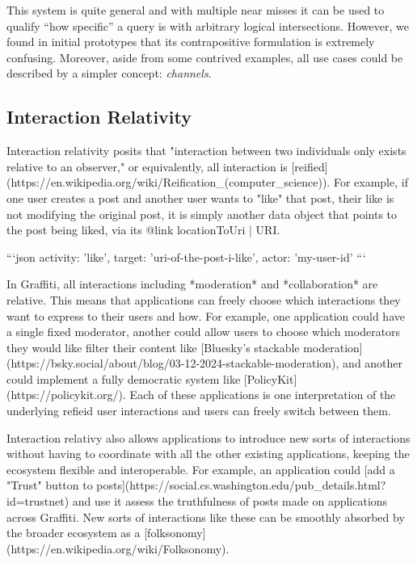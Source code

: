 This system is quite general and with multiple near misses it can be used to qualify ``how specific'' a query is with arbitrary logical intersections.
However, we found in initial prototypes that its contrapositive formulation is extremely confusing.
Moreover, aside from some contrived examples, all use cases could be described by a simpler concept: \emph{channels}.

\subsection{Interaction Relativity}

Interaction relativity posits that "interaction between two individuals only
exists relative to an observer," or equivalently, all interaction is [reified](https://en.wikipedia.org/wiki/Reification_(computer_science)).
For example, if one user creates a post and another user wants to "like" that post,
their like is not modifying the original post, it is simply another data object that points
to the post being liked, via its {@link locationToUri | URI}.

```json
{
  activity: 'like',
  target: 'uri-of-the-post-i-like',
  actor: 'my-user-id'
}
```

In Graffiti, all interactions including *moderation* and *collaboration* are relative.
This means that applications can freely choose which interactions
they want to express to their users and how.
For example, one application could have a single fixed moderator,
another could allow users to choose which moderators they would like filter their content
like [Bluesky's stackable moderation](https://bsky.social/about/blog/03-12-2024-stackable-moderation),
and another could implement a fully democratic system like [PolicyKit](https://policykit.org/).
Each of these applications is one interpretation of the underlying refieid user interactions and
users can freely switch between them.

Interaction relativy also allows applications to introduce new sorts of interactions
without having to coordinate with all the other existing applications,
keeping the ecosystem flexible and interoperable.
For example, an application could [add a "Trust" button to posts](https://social.cs.washington.edu/pub_details.html?id=trustnet)
and use it assess the truthfulness of posts made on applications across Graffiti.
New sorts of interactions like these can be smoothly absorbed by the broader ecosystem
as a [folksonomy](https://en.wikipedia.org/wiki/Folksonomy).

